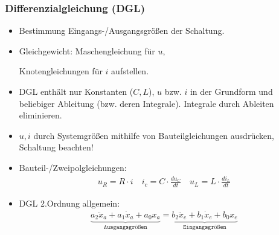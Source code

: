 \normalsize
\subsubsection{Differenzialgleichung (DGL)}
\begin{itemize}[leftmargin=*]
	\small
	\item Bestimmung Eingangs-/Ausgangsgr\"o\ss en der Schaltung.
	\item Gleichgewicht: Maschengleichung für $u$,\par Knotengleichungen f\"ur $i$ aufstellen.
	\item DGL enth\"alt nur Konstanten ($C,L$), $u$ bzw. $i$ in der Grundform und beliebiger Ableitung (bzw. deren Integrale). Integrale durch Ableiten eliminieren.
	\item $u,i$ durch Systemgr\"o\ss en mithilfe von Bauteilgleichungen ausdr\"ucken, Schaltung beachten!
	\normalsize
	\item Bauteil-/Zweipolgleichungen:
	\begin{gather*}
		u_R = R \cdot i \quad \boxed{i_c = C \cdot \frac{du_C}{dt}} \quad \boxed{u_L = L \cdot \frac{di_L}{dt}}
	\end{gather*}
	\item DGL 2.Ordnung allgemein:
\begin{gather*}
		\underbrace{a_2 \ddot{x}_a + a_1 \dot{x}_a + a_0 x_a}_{\texttt{Ausgangsgr\"o\ss en}} = \underbrace{b_2 \ddot{x}_e + b_1 \dot{x}_e + b_0 x_e}_{\texttt{Eingangsgr\"o\ss en}}
\end{gather*}
\end{itemize}

